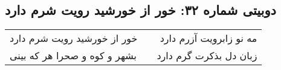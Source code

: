 \begin{center}
\section*{دوبیتی شماره ۳۲: خور از خورشید رویت شرم دارد}
\label{sec:032}
\begin{longtable}{l p{0.5cm} r}
خور از خورشید رویت شرم دارد
&&
مه نو زابرویت آزرم دارد
\\
بشهر و کوه و صحرا هر که بینی
&&
زبان دل بذکرت گرم دارد
\\
\end{longtable}
\end{center}
